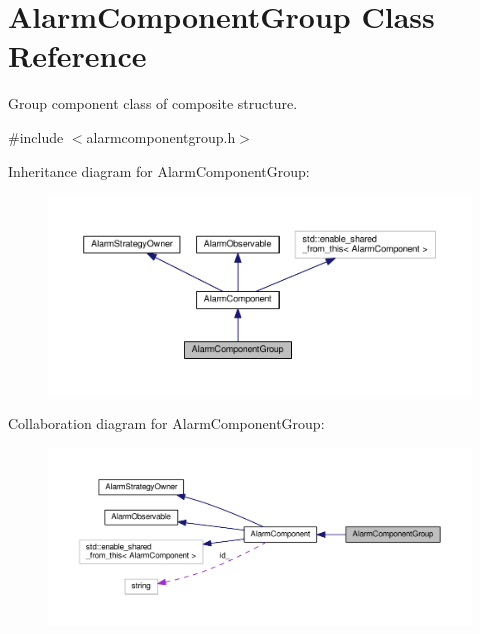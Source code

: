 \hypertarget{classAlarmComponentGroup}{}\section{Alarm\+Component\+Group Class Reference}
\label{classAlarmComponentGroup}


Group component class of composite structure.  




{\ttfamily \#include $<$alarmcomponentgroup.\+h$>$}



Inheritance diagram for Alarm\+Component\+Group\+:\nopagebreak
\begin{figure}[H]
\begin{center}
\leavevmode
\includegraphics[width=350pt]{classAlarmComponentGroup__inherit__graph}
\end{center}
\end{figure}


Collaboration diagram for Alarm\+Component\+Group\+:\nopagebreak
\begin{figure}[H]
\begin{center}
\leavevmode
\includegraphics[width=350pt]{classAlarmComponentGroup__coll__graph}
\end{center}
\end{figure}
